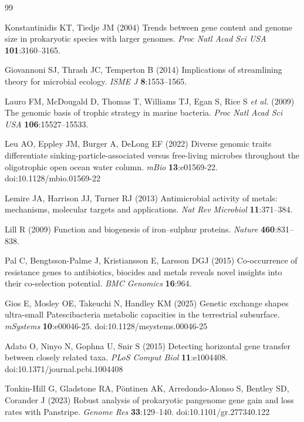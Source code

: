 \documentclass[times]{zHenriquesLab-StyleBioRxiv}
\begin{document}
\begin{thebibliography}{99}

Konstantinidis KT, Tiedje JM (2004) Trends between gene content and genome size
in prokaryotic species with larger genomes. \textit{Proc Natl Acad Sci USA}
\textbf{101}:3160--3165.

Giovannoni SJ, Thrash JC, Temperton B (2014) Implications of streamlining theory
for microbial ecology. \textit{ISME J} \textbf{8}:1553--1565.

Lauro FM, McDougald D, Thomas T, Williams TJ, Egan S, Rice S \textit{et al.}
(2009) The genomic basis of trophic strategy in marine bacteria. \textit{Proc
Natl Acad Sci USA} \textbf{106}:15527--15533.

Leu AO, Eppley JM, Burger A, DeLong EF (2022) Diverse genomic traits
differentiate sinking-particle-associated versus free-living microbes throughout
the oligotrophic open ocean water column. \textit{mBio}
\textbf{13}:e01569-22. doi:10.1128/mbio.01569-22

Lemire JA, Harrison JJ, Turner RJ (2013) Antimicrobial activity of metals:
mechanisms, molecular targets and applications. \textit{Nat Rev Microbiol}
\textbf{11}:371--384.

Lill R (2009) Function and biogenesis of iron--sulphur proteins. \textit{Nature}
\textbf{460}:831--838.

Pal C, Bengtsson-Palme J, Kristiansson E, Larsson DGJ (2015) Co-occurrence of
resistance genes to antibiotics, biocides and metals reveals novel insights into
their co-selection potential. \textit{BMC Genomics} \textbf{16}:964.

Gios E, Mosley OE, Takeuchi N, Handley KM (2025) Genetic exchange shapes
ultra-small Patescibacteria metabolic capacities in the terrestrial subsurface.
\textit{mSystems} \textbf{10}:e00046-25. doi:10.1128/msystems.00046-25

Adato O, Ninyo N, Gophna U, Snir S (2015) Detecting horizontal gene transfer
between closely related taxa. \textit{PLoS Comput Biol} \textbf{11}:e1004408.
doi:10.1371/journal.pcbi.1004408

Tonkin-Hill G, Gladstone RA, P\"{o}ntinen AK, Arredondo-Alonso S, Bentley SD,
Corander J (2023) Robust analysis of prokaryotic pangenome gene gain and loss
rates with Panstripe. \textit{Genome Res} \textbf{33}:129--140.
doi:10.1101/gr.277340.122


\end{thebibliography}
\end{document}
